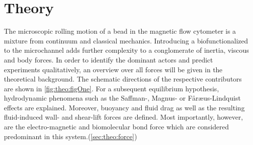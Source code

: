 \setcounter{page}{1}
\chapter{Theory}
The microscopic rolling motion of a bead in the magnetic flow cytometer is a mixture from continuum and classical mechanics. Introducing a biofunctionalized to the microchannel adds further complexity to a conglomerate of inertia, viscous and body forces. In order to identify the dominant actors and predict experiments qualitatively, an overview over all forces will be given in the theoretical background. The schematic directions of the respective contributors are shown in \cref{fig:theo:figOne}. For a subsequent equilibrium hypothesis, hydrodynamic phenomena such as the Saffman-, Magnus- or F\aa{}r\ae{}us-Lindquist effects are explained. Moreover, buoyancy and fluid drag as well as the resulting fluid-induced wall- and shear-lift forces are defined. Most importantly, however, are the electro-magnetic and biomolecular bond force which are considered predominant in this system.(\cref{sec:theo:force})

